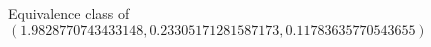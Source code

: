 \documentclass[preview]{standalone}
\begin{document}
\begin{center}
Equivalence class of $(1.9828770743433148, 0.23305171281587173, 0.11783635770543655)$
\end{center}
\end{document}
